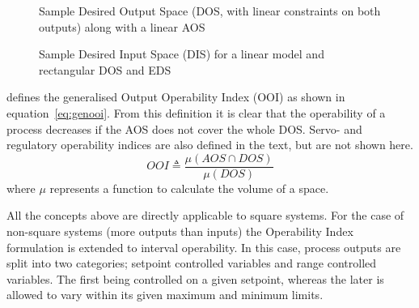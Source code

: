 \begin{figure}[htbp]
  \centering
  \scalebox{1}{}
  \caption[Sample Desired Output Space]{Sample Desired Output Space (DOS, with linear constraints on both outputs) along with a linear AOS}
  \label{fig:sampledos}
\end{figure}

\begin{figure}[htbp]
  \centering
  \scalebox{1}{}
  \caption[Sample Desired Input Space]{Sample Desired Input Space (DIS) for
    a linear model and rectangular DOS and EDS}
  \label{fig:sampledis}
\end{figure}

\citet{vinsonphd} defines the generalised Output Operability Index (OOI) as shown in equation~\ref{eq:genooi}. 
From this definition it is clear that the operability of a process decreases if the AOS does not cover the whole DOS. 
Servo- and regulatory operability indices are also defined in the text, but are not shown here.
\begin{equation}
  \label{eq:genooi}
     OOI \triangleq \frac{\mu(AOS\cap DOS)}{\mu(DOS)}
\end{equation}
where $\mu$ represents a function to calculate the volume of a space.%
%

All the concepts above are directly applicable to square systems.
For the case of non-square systems (more outputs than inputs) the Operability Index formulation is extended to interval operability. 
In this case, process outputs are split into two categories; setpoint controlled variables and range controlled variables.
The first being controlled on a given setpoint, whereas the later is allowed to vary within its given maximum and minimum limits.

